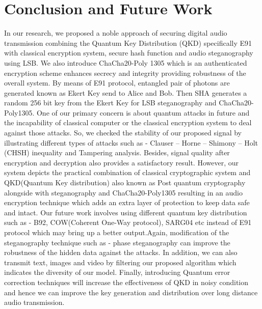 \documentclass[a4paper]{cas-sc}
\begin{document}
\section{Conclusion and Future Work}
\label{sec:conclusion}
In our research, we proposed a noble approach of securing digital audio transmission combining the Quantum Key Distribution (QKD) specifically E91 with classical encryption system, secure hash function and audio steganography using LSB. We also introduce ChaCha20-Poly 1305 which is an authenticated encryption scheme enhances secrecy and integrity providing robustness of the overall system. By means of E91 protocol, entangled pair of photons are generated known as Ekert Key send to Alice and Bob. Then SHA generates a random 256 bit key from the Ekert Key for LSB steganography and ChaCha20-Poly1305. One of our primary concern is about quantum attacks in future and the incapability of classical computer or the classical encryption system to deal against those attacks. So, we checked the stability of our proposed signal by illustrating different types of attacks such as - Clauser -- Horne -- Shimony -- Holt (CHSH) inequality and Tampering analysis. Besides, signal quality after encryption and decryption also provides a satisfactory result. However, our system depicts the practical combination of classical cryptographic system and QKD(Quantum Key distribution) also known as Post quantum cryptography alongside with steganography and ChaCha20-Poly1305 resulting in an audio encryption technique which adds an extra layer of protection to keep data safe and intact. Our future work involves using different quantum key distribution such as - B92, COW(Coherent One-Way protocol), SARG04  etc instead of E91 protocol which may bring up a better output.\cite{nurhadi2018quantum}Again, modification of the steganography technique such as - phase steganography can improve the robustness of the hidden data against the attacks. In addition, we can also transmit text, images and video by filtering our proposed algorithm which indicates the diversity of our model. Finally, introducing Quantum error correction techniques \cite{devitt2013quantum} will increase the effectiveness of QKD in noisy condition \cite{nagata2017quantum} and  hence we can improve the key generation and distribution over long distance audio transmission.

\end{document}
